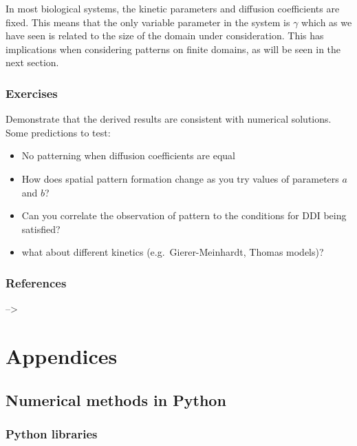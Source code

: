 \documentclass[
  letterpaper,
  DIV=11,
  numbers=noendperiod]{scrreprt}
\providecommand{\tightlist}{%
  \setlength{\itemsep}{0pt}\setlength{\parskip}{0pt}}\usepackage{longtable,booktabs,array}
\theoremstyle{definition}
\theoremstyle{plain}
\theoremstyle{plain}
\theoremstyle{remark}
\begin{document}
In most biological systems, the kinetic parameters and diffusion
coefficients are fixed. This means that the only variable parameter in
the system is \(\gamma\) which as we have seen is related to the size of
the domain under consideration. This has implications when considering
patterns on finite domains, as will be seen in the next section.

\hypertarget{exercises}{%
\section{Exercises}\label{exercises}}

Demonstrate that the derived results are consistent with numerical
solutions. Some predictions to test:

\begin{itemize}
\tightlist
\item
  No patterning when diffusion coefficients are equal
\item
  How does spatial pattern formation change as you try values of
  parameters \(a\) and \(b\)?
\item
  Can you correlate the observation of pattern to the conditions for DDI
  being satisfied?
\item
  what about different kinetics (e.g.~Gierer-Meinhardt, Thomas models)?
\end{itemize}

\hypertarget{references-2}{%
\section{References}\label{references-2}}

--\textgreater{}

\part{Appendices}

\hypertarget{numerical-methods-in-python}{%
\chapter{Numerical methods in
Python}\label{numerical-methods-in-python}}

\hypertarget{python-libraries}{%
\section{Python libraries}\label{python-libraries}}
\end{document}
